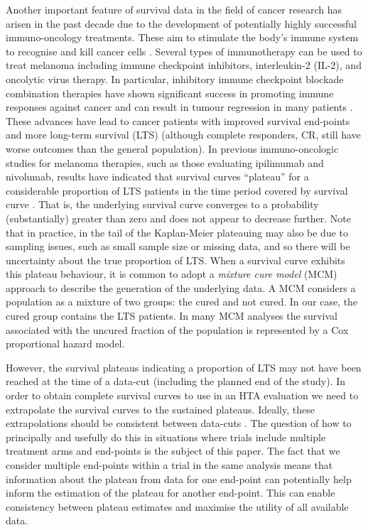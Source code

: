 \documentclass[AMA,STIX1COL]{WileyNJD-v2}
\begin{document}
Another important feature of survival data in the field of cancer research has arisen in the past decade due to the development of potentially highly successful immuno-oncology treatments.
These aim to stimulate the body’s immune system to recognise and kill cancer cells \cite{Ouwens2019}. Several types of immunotherapy can be used to treat melanoma including immune checkpoint inhibitors, interleukin-2 (IL-2), and oncolytic virus therapy.
In particular, inhibitory immune checkpoint blockade combination therapies have shown significant success in promoting immune responses against cancer and can result in tumour regression in many patients \cite{Khair2019}.
These advances have lead to cancer patients with improved survival end-points and more long-term survival (LTS) (although complete responders, CR, still have worse outcomes than the general population).
In previous immuno-oncologic studies for melanoma therapies, such as those evaluating ipilimumab and nivolumab, results have indicated that survival curves ``plateau'' for a considerable proportion of LTS patients in the time period covered by survival curve \citep{Wolchok2017, Larkin2019}.
That is, the underlying survival curve converges to a probability (substantially) greater than zero and does not appear to decrease further.
Note that in practice, in the tail of the Kaplan-Meier plateauing may also be due to sampling issues, such as small sample size or missing data, and so there will be uncertainty about the true proportion of LTS.
When a survival curve exhibits this plateau behaviour, it is common to adopt a \textit{mixture cure model} (MCM) approach to describe the generation of the underlying data.
A MCM considers a population as a mixture of two groups: the cured and not cured.
In our case, the cured group contains the LTS patients.
In many MCM analyses the survival associated with the uncured fraction of the population is represented by a Cox proportional hazard model.

However, the survival plateaus indicating a proportion of LTS may not have been reached at the time of a data-cut (including the planned end of the study).
In order to obtain complete survival curves to use in an HTA evaluation we need to extrapolate the survival curves to the sustained plateaus.
Ideally, these extrapolations should be consistent between data-cuts \citep{Bullement2020}.
The question of how to principally and usefully do this in situations where trials include multiple treatment arms and end-points is the subject of this paper.
The fact that we consider multiple end-points within a trial in the same analysis means that information about the plateau from data for one end-point can potentially help inform the estimation of the plateau for another end-point.
This can enable consistency between plateau estimates and maximise the utility of all available data.
\end{document}
